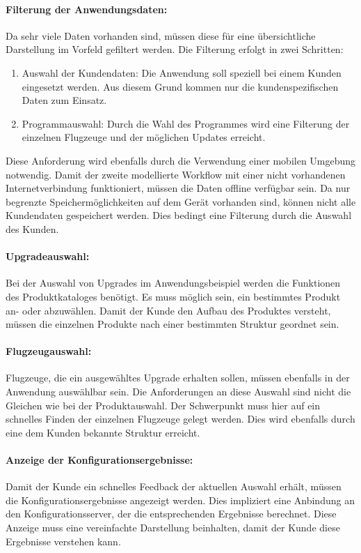 \paragraph{Filterung der Anwendungsdaten: } Da sehr viele Daten vorhanden sind, müssen diese für eine übersichtliche Darstellung im Vorfeld gefiltert werden. Die Filterung erfolgt in zwei Schritten:
\begin{enumerate}
\item Auswahl der Kundendaten: Die Anwendung soll speziell bei einem Kunden eingesetzt werden. Aus diesem Grund kommen nur die kundenspezifischen Daten zum Einsatz.
\item Programmauswahl: Durch die Wahl des Programmes wird eine Filterung der einzelnen Flugzeuge und der möglichen Updates erreicht.
\end{enumerate}
Diese Anforderung wird ebenfalls durch die Verwendung einer mobilen Umgebung notwendig. Damit der zweite modellierte Workflow mit einer nicht vorhandenen Internetverbindung funktioniert, müssen die Daten offline verfügbar sein. Da nur begrenzte Speichermöglichkeiten auf dem Gerät vorhanden sind, können nicht alle Kundendaten gespeichert werden. Dies bedingt eine Filterung durch die Auswahl des Kunden.

\paragraph{Upgradeauswahl: } Bei der Auswahl von Upgrades im Anwendungsbeispiel werden die Funktionen des Produktkataloges benötigt. Es muss möglich sein, ein bestimmtes Produkt an- oder abzuwählen. Damit der Kunde den Aufbau des Produktes versteht, müssen die einzelnen Produkte nach einer bestimmten Struktur geordnet sein. 

\paragraph{Flugzeugauswahl: } Flugzeuge, die ein ausgewähltes Upgrade erhalten sollen, müssen ebenfalls in der Anwendung auswählbar sein. Die Anforderungen an diese Auswahl sind nicht die Gleichen wie bei der Produktauswahl. Der Schwerpunkt muss hier auf ein schnelles Finden der einzelnen Flugzeuge gelegt werden. Dies wird ebenfalls durch eine dem Kunden bekannte Struktur erreicht. 

\paragraph{Anzeige der Konfigurationsergebnisse: } Damit der Kunde ein schnelles Feedback der aktuellen Auswahl erhält, müssen die Konfigurationsergebnisse angezeigt werden. Dies impliziert eine Anbindung an den Konfigurationsserver, der die entsprechenden Ergebnisse berechnet. Diese Anzeige muss eine vereinfachte Darstellung beinhalten, damit der Kunde diese Ergebnisse verstehen kann.

